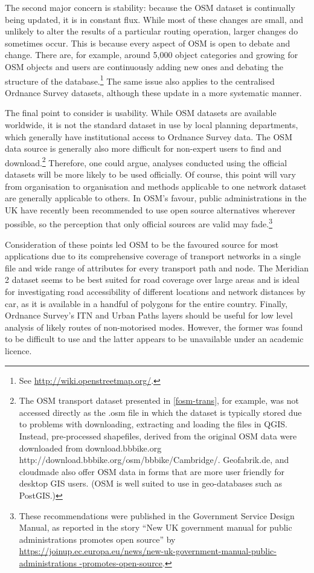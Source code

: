 \documentclass[a4paper, 11pt, twoside]{Thesis}
\begin{document}
The second major concern is stability: because the OSM dataset is
continually being updated, it is in constant flux. While most of these changes
are small, and unlikely to alter the results of a particular routing operation,
larger changes do sometimes occur. This is because every aspect of OSM is open
to debate and change. There are, for example, around 5,000 object categories and
growing for OSM objects and users are continuously adding new ones and debating
the structure of the database.\footnote{See
\href{http://wiki.openstreetmap.org/wiki/Map_Features}{
http://wiki.openstreetmap.org/}.} The same issue also applies to the
centralised Ordnance Survey datasets, although these update in a more
systematic manner.

The final point to consider is usability. While OSM datasets are available
worldwide, it is not the standard dataset in use by local planning departments,
which generally have institutional access to Ordnance Survey data. The 
OSM data source is generally also more difficult for non-expert users to find and
download.\footnote{The
OSM transport dataset presented in \cref{fosm-trans}, for example, was not
accessed directly as the .osm file in which the dataset is typically
stored due to problems with downloading, extracting and loading the files in
QGIS. Instead, pre-processed shapefiles, derived from the original OSM data
were downloaded from
{download.bbbike.org}{
http://download.bbbike.org/osm/bbbike/Cambridge/}. Geofabrik.de, and cloudmade
also offer OSM data in forms that are more user friendly for desktop GIS users.
(OSM is well suited to use in geo-databases such as PostGIS.)} Therefore,
one could argue, analyses conducted using the official datasets will be more
likely to be used officially. Of course, this point will vary from organisation
to organisation and methods applicable to one network dataset are generally
applicable to others. In OSM's favour, public administrations in the UK have
recently been recommended to use open source alternatives wherever possible, so
the perception that only official sources are valid may
fade.\footnote{These
recommendations were published in the Government Service Design Manual, as
reported in the story ``New UK government manual for public administrations
promotes open source'' by \href{https://joinup.ec.europa.eu/}{
https://joinup.ec.europa.eu/news/new-uk-government-manual-public-administrations
-promotes-open-source}.}

Consideration of these points led OSM to be the favoured source for most
applications due to its comprehensive coverage of transport networks in a
single file and wide range of attributes for every transport path and node. The
Meridian 2 dataset seems to be best suited for road coverage over large areas
and is ideal for investigating road accessibility of different locations and
network distances by car, as it is available in a handful of polygons for the
entire country. Finally, Ordnance Survey's ITN and Urban Paths layers should be
useful for low level analysis of likely routes of non-motorised modes. However, the
former was found to be difficult to use
and the latter appears to be unavailable under an academic licence.
\end{document}
